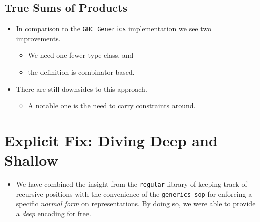 \subsection{True Sums of Products}
\begin{itemize}
    \item In comparison to the \texttt{GHC Generics} implementation we see two improvements.
    \begin{itemize}
        \item We need one fewer type class, and
        \item the definition is combinator-based.
    \end{itemize}
    \item There are still downsides to this approach.
    \begin{itemize}
        \item A notable one is the need to carry constraints around.
    \end{itemize}
\end{itemize}

\section{Explicit Fix: Diving Deep and Shallow}
\begin{itemize}
    \item We have combined the insight from the \texttt{regular} library of keeping track of recursive positions with the convenience of the \texttt{generics-sop} for enforcing a specific \textit{normal form} on representations. By doing so, we were able to provide a \textit{deep} encoding for free.
\end{itemize}
